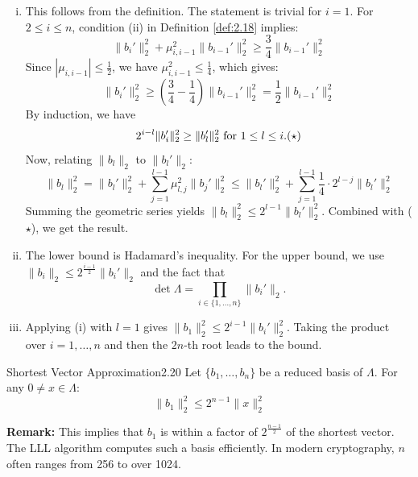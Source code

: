 \documentclass{Vorlesungstemplate_English} %
\begin{document}
\begin{pf} \hfill
    \begin{enumerate}[(i)] \item This follows from the definition. The statement is trivial for $i=1$.
    For $2 \le i \le n$, condition (ii) in Definition \ref{def:2.18} implies:
    \[ \|b_i'\|_2^2 + \mu_{i,i-1}^2 \|b_{i-1}'\|_2^2 \ge \frac{3}{4} \|b_{i-1}'\|_2^2 \]
    Since $|\mu_{i,i-1}| \le \frac{1}{2}$, we have $\mu_{i,i-1}^2 \le \frac{1}{4}$, which gives:
    \[ \|b_i'\|_2^2 \ge \left( \frac{3}{4} - \frac{1}{4} \right) \|b_{i-1}'\|_2^2 = \frac{1}{2} \|b_{i-1}'\|_2^2 \]
    By induction, we have \[2^{i-l} \|b_i'\|_2^2 \ge \|b_l'\|_2^2\text{ for }1 \le l \le i. \hfill (\star)\]
    Now, relating $\|b_l\|_2$ to $\|b_l'\|_2$:
    \[ \|b_l\|_2^2 = \|b_l'\|_2^2 + \sum_{j=1}^{l-1} \mu_{l,j}^2 \|b_j'\|_2^2 \le \|b_l'\|_2^2 + \sum_{j=1}^{l-1} \frac{1}{4} \cdot 2^{l-j} \|b_l'\|_2^2 \]
    Summing the geometric series yields $\|b_l\|_2^2 \le 2^{l-1} \|b_l'\|_2^2$. Combined with ($\star$), we get the result.

    \item The lower bound is Hadamard's inequality. For the upper bound, we use $\|b_i\|_2 \le 2^{\frac{i-1}{2}} \|b_i'\|_2$ and the fact that \[\det \Lambda = \prod_{i \in \{ 1, \dots, n\}} \|b_i'\|_2.\]
    \item Applying (i) with $l=1$ gives $\|b_1\|_2^2 \le 2^{i-1} \|b_i'\|_2^2$. Taking the product over $i=1, \dots, n$ and then the $2n$-th root leads to the bound. \qedhere
    \end{enumerate}
\end{pf}

\begin{proposition}{Shortest Vector Approximation}{2.20}
    Let $\{ b_1, \dots, b_n \}$ be a reduced basis of $\Lambda$. For any $0 \neq x \in \Lambda$:
    \[ \|b_1\|_2^2 \le 2^{n-1} \|x\|_2^2 \]
\end{proposition}

\noindent \textbf{Remark:} This implies that $b_1$ is within a factor of $2^{\frac{n-1}{2}}$ of the shortest vector. The LLL algorithm computes such a basis efficiently. In modern cryptography, $n$ often ranges from 256 to over 1024.
\end{document}
